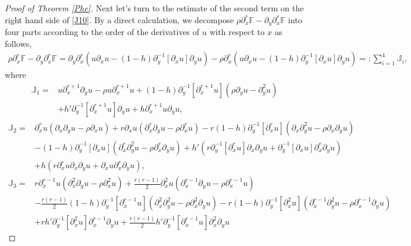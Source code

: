 \documentclass{amsart}
\numberwithin{equation}{section}
\begin{document}
\begin{proof}[Proof of Theorem \ref{Phe}]
Next let's turn to the estimate of the second term on the right hand side of \eqref{J10}. By a direct calculation, we decompose $\rho\partial_{x}^{r}\mathbb{F}-\partial_{y}\partial_{x}^{r}\mathbb{F}$ into four parts according to the order of the derivatives of $u$ with respect to $x$ as follows,
\begin{align*}
\rho\partial_{x}^{r}\mathbb{F}-\partial_{y}\partial_{x}^{r}\mathbb{F}
= \partial_{y}\partial_{x}^{r}\left(u\partial_{x}u-(1-h)\partial_{y}^{-1}[\partial_{x}u]\partial_{y}u\right)
  -\rho\partial_{x}^{r}\left(u\partial_{x}u-(1-h)\partial_{y}^{-1}[\partial_{x}u]\partial_{y}u\right)
=: \sum_{i=1}^{4}\mathbb{J}_{i},
\end{align*}
where
\begin{align*}
\mathbb{J}_{1}
=& u\partial_{x}^{r+1}\partial_{y}u
  -\rho u\partial_{x}^{r+1}u
  +(1-h)\partial_{y}^{-1}[\partial_{x}^{r+1}u](\rho\partial_{y}u-\partial_{y}^{2}u)\\
 &+h'\partial_{y}^{-1}[\partial_{x}^{r+1}u]\partial_{y}u
  +h\partial_{x}^{r+1}u\partial_{y}u,
\end{align*}
\begin{align*}
\mathbb{J}_{2}
=& \partial_{x}^{r}u(\partial_{x}\partial_{y}u-\rho\partial_{x}u)
  +r\partial_{x}u(\partial_{x}^{r}\partial_{y}u-\rho\partial_{x}^{r}u)
  -r(1-h)\partial_{y}^{-1}[\partial_{x}^{r}u](\partial_{x}\partial_{y}^{2}u-\rho\partial_{x}\partial_{y}u)\\
 &-(1-h)\partial_{y}^{-1}[\partial_{x}u](\partial_{x}^{r}\partial_{y}^{2}u-\rho\partial_{x}^{r}\partial_{y}u)
  +h'(r\partial_{y}^{-1}[\partial_{x}^{r}u]\partial_{x}\partial_{y}u+\partial_{y}^{-1}[\partial_{x}u]\partial_{x}^{r}\partial_{y}u)\\
 &+h(r\partial_{x}^{r}u\partial_{x}\partial_{y}u+\partial_{x}u\partial_{x}^{r}\partial_{y}u),
\end{align*}
\begin{align*}
\mathbb{J}_{3}
=& r\partial_{x}^{r-1}u(\partial_{x}^{2}\partial_{y}u-\rho\partial_{x}^{2}u)
  +\frac{r(r-1)}{2}\partial_{x}^{2}u(\partial_{x}^{r-1}\partial_{y}u-\rho\partial_{x}^{r-1}u)\\
 &-\frac{r(r-1)}{2}(1-h)\partial_{y}^{-1}[\partial_{x}^{r-1}u](\partial_{x}^{2}\partial_{y}^{2}u-\rho\partial_{x}^{2}\partial_{y}u)
  -r(1-h)\partial_{y}^{-1}[\partial_{x}^{2}u](\partial_{x}^{r-1}\partial_{y}^{2}u-\rho\partial_{x}^{r-1}\partial_{y}u)\\
 &+rh'\partial_{y}^{-1}[\partial_{x}^{2}u]\partial_{x}^{r-1}\partial_{y}u
  +\frac{r(r-1)}{2}h'\partial_{y}^{-1}[\partial_{x}^{r-1}u]\partial_{x}^{2}\partial_{y}u

\end{align*}
\end{proof}
\end{document}

